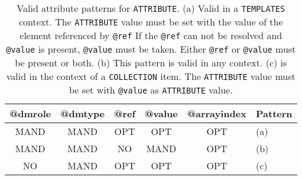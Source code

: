 
\begin{table}[!htbp]
\small
\centering
\begin{tabulary}{\linewidth}{|c|c|c|c|c|J|}
    \hline 
        \textbf{@dmrole} &
        \textbf{@dmtype} &
        \textbf{@ref} &
        \textbf{@value} &
        \textbf{@arrayindex} &
        \textbf{Pattern}\\
    \hline     
    \hline  
        MAND &           
        MAND &           
        OPT &           
        OPT &           
        OPT &   
        (a)\\
    \hline   
        MAND &           
        MAND &           
        NO &           
        MAND &           
        OPT &   
        (b)\\
    \hline  
        NO &           
        MAND &           
        OPT &           
        OPT &           
        OPT &   
        (c) \\
   \hline 
\end{tabulary}
     \caption{Valid attribute patterns for \texttt{ATTRIBUTE}. (a) Valid in a \texttt{TEMPLATES} context.        
        The \texttt{ATTRIBUTE} value must be set with the value of the element referenced by \texttt{@ref} 
       If the \texttt{@ref} can not be resolved and \texttt{@value} is present, \texttt{@value} must be taken. Either \texttt{@ref} or \texttt{@value} must be present or both. (b) This pattern 
        is valid in any context.  (c) is valid in the context of a \texttt{COLLECTION} item.    
        The \texttt{ATTRIBUTE} value must be set with \texttt{@value} as \texttt{ATTRIBUTE} value.} 
     \label{tbl:attribute-pattern}
 \end{table}
